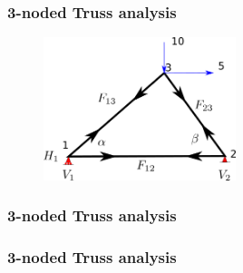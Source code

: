 \documentclass[notes]{beamer}
\begin{document}
\begin{frame}
	\frametitle{3-noded Truss analysis}
	\begin{figure}[ht]
		\centering
		\includegraphics[width=0.5\textwidth]{figs/3truss.png}
	\end{figure}
	\vspace{4cm}
\end{frame}


\begin{frame}
	\frametitle{3-noded Truss analysis}
	\vspace{4cm}
\end{frame}

\begin{frame}
	\frametitle{3-noded Truss analysis}
	\vspace{4cm}
\end{frame}
\end{document}

